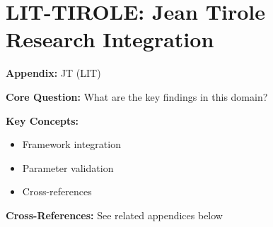 

\chapter{LIT-TIROLE: Jean Tirole Research Integration}
\label{app:lit-tirole}


\begin{tcolorbox}[colback=blue!5!white, colframe=blue!75!black,
    title=Quick Reference: Appendix JT]

\textbf{Appendix:} JT (LIT)

\textbf{Core Question:} What are the key findings in this domain?

\textbf{Key Concepts:}
\begin{itemize}[nosep]
\item Framework integration
\item Parameter validation
\item Cross-references
\end{itemize}

\textbf{Cross-References:} See related appendices below
\end{tcolorbox}

